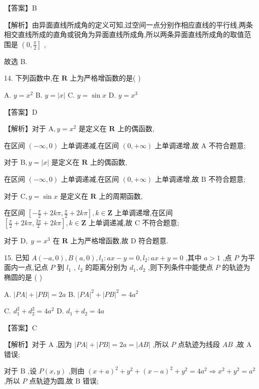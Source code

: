 \documentclass[10pt]{article}
\begin{document}
【答案】B

【解析】由异面直线所成角的定义可知,过空间一点分别作相应直线的平行线,两条相交直线所成的直角或锐角为异面直线所成角,所以两条异面直线所成角的取值范围是 \(\left( {0,\frac{\pi }{2}}\right\rbrack\) ,

故选 B.

14. 下列函数中,在 \(\mathbf{R}\) 上为严格增函数的是( )

A. \(y = {x}^{2}\) B. \(y = \left| x\right|\) C. \(y = \sin x\) D. \(y = {x}^{3}\)

【答案】D

【解析】对于 \(\mathrm{A},y = {x}^{2}\) 是定义在 \(\mathbf{R}\) 上的偶函数,

在区间 \(\left( {-\infty ,0}\right)\) 上单调递减,在区间 \(\left( {0, + \infty }\right)\) 上单调递增,故 \(\mathrm{A}\) 不符合题意;

对于 \(\mathrm{B},y = \left| x\right|\) 是定义在 \(\mathbf{R}\) 上的偶函数,

在区间 \(\left( {-\infty ,0}\right)\) 上单调递减,在区间 \(\left( {0, + \infty }\right)\) 上单调递增,故 \(\mathrm{B}\) 不符合题意;

对于 \(\mathrm{C},y = \sin x\) 是定义在 \(\mathbf{R}\) 上的周期函数,

在区间 \(\left\lbrack  {-\frac{\pi }{2} + {2k\pi },\frac{\pi }{2} + {2k\pi }}\right\rbrack  ,k \in  \mathbf{Z}\) 上单调递增,在区间 \(\left\lbrack  {\frac{\pi }{2} + {2k\pi },\frac{3\pi }{2} + {2k\pi }}\right\rbrack  ,k \in  \mathbf{Z}\) 上单调递减,故 \(\mathrm{C}\) 不符合题意;

对于 \(\mathrm{D},\;y = {x}^{3}\) 在 \(\mathbf{R}\) 上为严格增函数,故 \(\mathrm{D}\) 符合题意.

15. 已知 \(A\left( {-a,0}\right) ,B\left( {a,0}\right) ,{l}_{1} : {ax} - y = 0,{l}_{2} : {ax} + y = 0\) ,其中 \(a > 1\) ,点 \(P\) 为平面内一点,记点 \(P\) 到 \({l}_{1}\) , \({l}_{2}\) 的距离分别为 \({d}_{1},{d}_{2}\) ,则下列条件中能使点 \(P\) 的轨迹为椭圆的是 ( )

A. \(\left| {PA}\right|  + \left| {PB}\right|  = {2a}\) B. \({\left| PA\right| }^{2} + {\left| PB\right| }^{2} = 4{a}^{2}\)

C. \({d}_{1}^{2} + {d}_{2}^{2} = 4{a}^{2}\) D. \({d}_{1} + {d}_{2} = {4a}\)

【答案】C

【解析】对于 \(\mathrm{A}\) ,因为 \(\left| {PA}\right|  + \left| {PB}\right|  = {2a} = \left| {AB}\right|\) ,所以 \(P\) 点轨迹为线段 \({AB}\) ,故 \(\mathrm{A}\) 错误;

对于 \(\mathrm{B}\) ,设 \(P\left( {x,y}\right)\) ,则由 \({\left( x + a\right) }^{2} + {y}^{2} + {\left( x - a\right) }^{2} + {y}^{2} = 4{a}^{2} \Rightarrow  {x}^{2} + {y}^{2} = {a}^{2}\) ,所以 \(P\) 点轨迹为圆,故 \(\mathrm{B}\) 错误;
\end{document}
